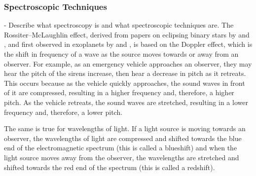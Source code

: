 \documentclass[oneside,12pt]{amsart}
\numberwithin{page}{section}
\begin{document}
\subsubsection{Spectroscopic Techniques}\label{sec:obs-spec}
- Describe what spectroscopy is and what spectroscopic techniques are.
The Rossiter–McLaughlin effect, derived from papers on eclipsing binary stars by \citep{rossiter1924detection} and \citep{mclaughlin1924some}, and first observed in exoplanets by \citep{queloz2000detection} and \citep{bundy2000search}, is based on the Doppler effect, which is the shift in frequency of a wave as the source moves towards or away from an observer. For example, as an emergency vehicle approaches an observer, they may hear the pitch of the sirens increase, then hear a decrease in pitch as it retreats. This occurs because as the vehicle quickly approaches, the sound waves in front of it are compressed, resulting in a higher frequency and, therefore, a higher pitch. As the vehicle retreats, the sound waves are stretched, resulting in a lower frequency and, therefore, a lower pitch. 

The same is true for wavelengths of light. If a light source is moving towards an observer, the wavelengths of light are compressed and shifted towards the blue end of the electromagnetic spectrum (this is called a blueshift) and when the light source moves away from the observer, the wavelengths are stretched and shifted towards the red end of the spectrum (this is called a redshift).
\end{document}
